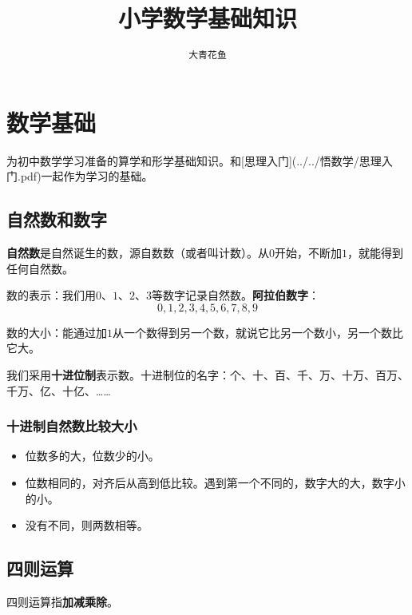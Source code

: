 \documentclass[12pt,UTF8]{ctexbook}
\title{\zihao{0} \bfseries 小学数学基础知识}
\author{\zihao{2} \texttt{大青花鱼}}
\date{}
\begin{document}
\maketitle
\tableofcontents
\newpage

\chapter{数学基础}

为初中数学学习准备的算学和形学基础知识。和[思理入门](../../悟数学/思理入门.pdf)一起作为学习的基础。



\begin{center}
\end{center}

\section{自然数和数字}

\textbf{自然数}是自然诞生的数，源自数数（或者叫计数）。从\( 0 \)开始，不断加\( 1 \)，就能得到任何自然数。

数的表示：我们用\( 0 \)、\( 1 \)、\( 2 \)、\( 3 \)等数字记录自然数。\textbf{阿拉伯数字}：
\[ 0,1,2,3,4,5,6,7,8,9 \]

数的大小：能通过加\( 1 \)从一个数得到另一个数，就说它比另一个数小，另一个数比它大。

我们采用\textbf{十进位制}表示数。十进制位的名字：个、十、百、千、万、十万、百万、千万、亿、十亿、……

\subsection{十进制自然数比较大小}

\begin{itemize}
\item 位数多的大，位数少的小。
\item 位数相同的，对齐后从高到低比较。遇到第一个不同的，数字大的大，数字小的小。
\item 没有不同，则两数相等。
\end{itemize}

\section{四则运算}

四则运算指\textbf{加减乘除}。
\end{document}

